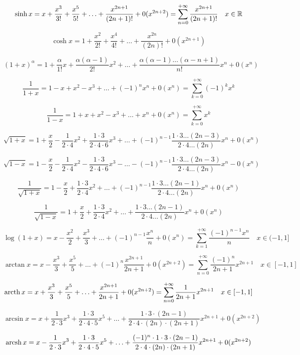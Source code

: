 \documentclass{book}
\begin{document}
$$
\sinh x=x + \frac{ x^3}{3!}+\frac{ x^5}{5!}+\ldots+ \frac{x^{2n+1}}{(2n+1)!}+
0(x^{2n+2})
=
\sum_{n=0}^{+\infty} \frac{x^{2n+1}}{(2n+1)!}
\quad x \in \mathbb{R}
$$

$$
\cosh x =
1 + \frac{ x^2}{2!} + \frac{ x^4}{4!}
+ \ldots +
\frac{ x^{2n}}{(2n)!} + 0(x^{2n+1})
$$

$$
(1+x)^\alpha = 1+\frac{ \alpha}{1!}x + \frac{ \alpha(\alpha-1)}{2!}x^2
+\ldots+
\frac{ \alpha(\alpha-1)\ldots(\alpha-n+1)}{n!}x^n+
0(x^n)
$$

$$
\frac{ 1}{1+x}= 1 -x +x^2-x^3+\ldots +(-1)^n x^n +0(x^n)=\sum_{k=0}^{+\infty}(-1)^kx^k
$$

$$
\frac{ 1}{1-x}= 1 +x +x^2-x^3+\ldots +x^n +0(x^n)=\sum_{k=0}^{+\infty}x^k
$$

$$
\sqrt{1+x}= 1+\frac{ x}{2}-\frac{ 1}{2\cdot 4}x^2+ \frac{ 1\cdot3}{2\cdot4\cdot6}x^3
+\ldots+
(-1)^{n-1} \frac{1\cdot3\ldots(2n-3)}{2\cdot4\ldots(2n)}x^n +0(x^n)
$$

$$
\sqrt{1-x}= 1-\frac{ x}{2}-\frac{ 1}{2\cdot 4}x^2- \frac{ 1\cdot3}{2\cdot4\cdot6}x^3
-\ldots-
(-1)^{n-1} \frac{1\cdot3\ldots(2n-3)}{2\cdot4\ldots(2n)}x^n -0(x^n)
$$

$$
\frac{ 1}{\sqrt{1+x}}
= 1-\frac{ x}{2}+\frac{ 1\cdot3}{2\cdot 4}x^2
+\ldots+
(-1)^{n-1} \frac{1\cdot3\ldots(2n-1)}{2\cdot4\ldots(2n)}x^n +0(x^n)
$$

$$
\frac{ 1}{\sqrt{1-x}}
= 1+\frac{ x}{2}+\frac{ 1\cdot3}{2\cdot 4}x^2
+\ldots+
\frac{1\cdot3\ldots(2n-1)}{2\cdot4\ldots(2n)}x^n +0(x^n)
$$

$$
\log (1+x)=
x-\frac{ x^2}{2}+\frac{ x^3}{3}+\ldots+ (-1)^{n-1} \frac{ x^n}{n}+0(x^n)
=\sum_{k=1}^{+\infty}\frac{(-1)^{n-1}x^n}{n}
\quad x\in(-1,1]
$$

$$
\arctan x=x-\frac{ x^3}{3}+\frac{ x^5}{5}+\ldots+ (-1)^n \frac{x^{2n+1}}{2n+1}+
0(x^{2n+2})
=
\sum_{n=0}^{+\infty} \frac{(-1)^n}{2n+1} x^{2n+1}
\quad x\in[-1,1]
$$

$$
\operatorname{arcth} x=x+\frac{ x^3}{3}+\frac{ x^5}{5}+\ldots+ \frac{x^{2n+1}}{2n+1}+
0(x^{2n+2})
=
\sum_{n=0}^{+\infty} \frac{1}{2n+1} x^{2n+1}
\quad x\in[-1,1]
$$


$$
\arcsin x=
x+ \frac{ 1}{2\cdot3}x^3+\frac{1\cdot3}{2\cdot4\cdot5}x^5
+\ldots+
\frac{ 1\cdot3\cdot(2n-1)}{2\cdot4\cdot(2n)\cdot(2n+1)}x^{2n+1}+0(x^{2n+2})
$$

$$
\operatorname{arcsh} x=
x-\frac{ 1}{2\cdot3}x^3+\frac{1\cdot3}{2\cdot4\cdot5}x^5
+\ldots+
\frac{ (-1)^n \cdot1\cdot3\cdot(2n-1)}{2\cdot4\cdot(2n)\cdot(2n+1)}x^{2n+1}+0(x^{2n+2})
$$
\end{document}
